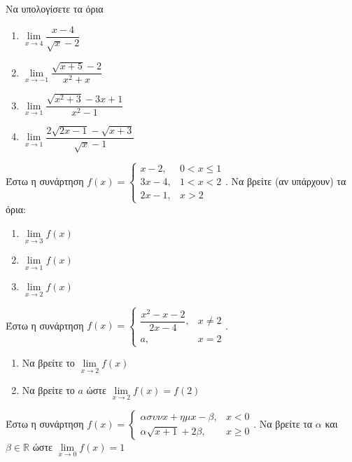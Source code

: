 \documentclass{presentation}
\begin{document}
\begin{askisi}
  Να υπολογίσετε τα όρια
  \begin{enumerate}
    \item $\lim\limits_{x \to 4}{ \dfrac{x-4}{\sqrt{x}-2} }$ \pause
    \item $\lim\limits_{x \to -1}{ \dfrac{\sqrt{x+5}-2}{x^2+x} }$ \pause
    \item $\lim\limits_{x \to 1}{ \dfrac{\sqrt{x^2+3}-3x+1}{x^2-1} }$ \pause
    \item $\lim\limits_{x \to 1}{ \dfrac{2\sqrt{2x-1}-\sqrt{x+3}}{\sqrt{x}-1} }$
  \end{enumerate}
\end{askisi}

\begin{askisi}
  Έστω η συνάρτηση $f(x)=\begin{cases}
      x-2,  & 0<x\le 1 \\
      3x-4, & 1<x<2    \\
      2x-1, & x>2
    \end{cases}$.
  Να βρείτε (αν υπάρχουν) τα όρια:
  \begin{enumerate}
    \item $\lim\limits_{x \to 3}{ f(x) }$ \pause
    \item $\lim\limits_{x \to 1}{ f(x) }$ \pause
    \item $\lim\limits_{x \to 2}{ f(x) }$
  \end{enumerate}
\end{askisi}

\begin{askisi}
  Έστω η συνάρτηση $f(x)=\begin{cases}
      \dfrac{x^2-x-2}{2x-4}, & x\ne 2 \\
      a,                     & x=2
    \end{cases}$.
  \begin{enumerate}
    \item Να βρείτε το $\lim\limits_{x \to 2}{ f(x) }$ \pause
    \item Να βρείτε το $a$ ώστε $\lim\limits_{x \to 2}{ f(x) }=f(2)$
  \end{enumerate}
\end{askisi}

\begin{askisi}
  Έστω η συνάρτηση $f(x)=\begin{cases}
      ασυνx+ημx-β,    & x<0    \\
      α\sqrt{x+1}+2β, & x\ge 0
    \end{cases}$.
  Να βρείτε τα $α$ και $β\in\mathbb{R}$ ώστε $\lim\limits_{x \to 0}{ f(x) }=1$

\end{askisi}
\end{document}
